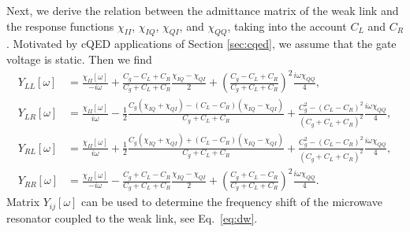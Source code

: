 \documentclass[aps,reprint,longbibliography, prb]{revtex4-2}
\begin{document}
Next, we derive the relation between the admittance matrix of the weak link and the response functions $\chi_{II}$, $\chi_{IQ}$, $\chi_{QI}$, and $\chi_{QQ}$, taking into the account $C_L$ and $C_R$. Motivated by cQED applications of Section \ref{sec:cqed}, we assume that the gate voltage is static. Then we find  
\begin{subequations}
\label{eq:admit}
    \begin{align}
        Y_{LL}[\omega]&=
        \frac{\chi_{II}[\omega]}{-i\omega}+\frac{C_g-C_L+C_R}{C_g+C_L+C_R}\frac{\chi_{IQ}-\chi_{QI}}{2}+\left(\frac{C_g - C_L + C_R}{C_g + C_L + C_R}\right)^2\frac{i\omega\chi_{QQ}}{4},\\
        Y_{LR}[\omega]&=
        \frac{\chi_{II}[\omega]}{i\omega}-\frac{1}{2}\frac{C_g(\chi_{IQ}+\chi_{QI})-(C_L-C_R)(\chi_{IQ}-\chi_{QI})}{C_g+C_L+C_R}+\frac{C_g^2-(C_L-C_R)^2}{(C_g+C_L+C_R)^2}\frac{i\omega\chi_{QQ}}{4},\\
        Y_{RL}[\omega]&=
        \frac{\chi_{II}[\omega]}{i\omega}+\frac{1}{2}\frac{C_g(\chi_{IQ}+\chi_{QI})+(C_L-C_R)(\chi_{IQ}-\chi_{QI})}{C_g+C_L+C_R}+\frac{C_g^2-(C_L-C_R)^2}{(C_g+C_L+C_R)^2}\frac{i\omega\chi_{QQ}}{4},\\
        Y_{RR}[\omega]&=
        \frac{\chi_{II}[\omega]}{-i\omega}-\frac{C_g+C_L-C_R}{C_g+C_L+C_R}\frac{\chi_{IQ}-\chi_{QI}}{2}+\left(\frac{C_g + C_L - C_R}{C_g + C_L + C_R}\right)^2\frac{i\omega\chi_{QQ}}{4}.
    \end{align}
\end{subequations}
Matrix $Y_{ij}[\omega]$ can be used to determine the frequency shift of the microwave resonator coupled to the weak link, see Eq.~\eqref{eq:dw}.
\end{document}
